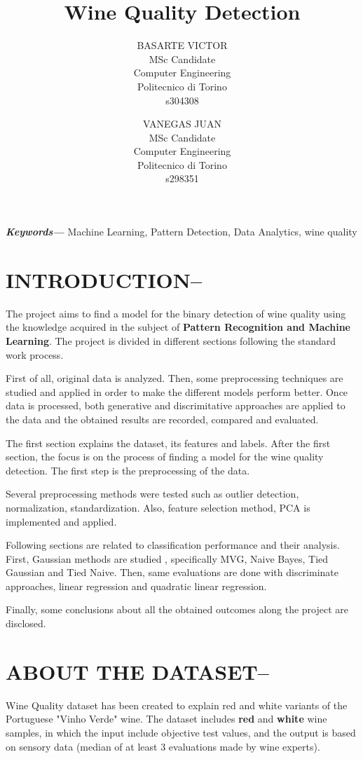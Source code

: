 \documentclass[12pt, twocolumn]{article}
\title{Wine Quality Detection}
\author{
  BASARTE VICTOR\\
  MSc Candidate\\
  Computer Engineering\\
  Politecnico di Torino\\
  s304308
  \\
  \and
  VANEGAS JUAN\\
  MSc Candidate\\
  Computer Engineering\\
  Politecnico di Torino\\
  s298351\\
}
\providecommand{\keywords}[1]{\textbf{\textit{Keywords---}} #1}
\begin{document}
  \maketitle

  \begin{abstract}
  \end{abstract}

  \keywords{ Machine Learning, Pattern Detection, Data Analytics, wine quality}


  \section{INTRODUCTION--}
  The project aims to find a model for the binary detection of wine quality
  using the knowledge acquired in the subject of \textbf{Pattern Recognition
  and
  Machine Learning}. The project is divided in different sections following the standard work process.

  First of all, original data is analyzed. Then, some preprocessing techniques are studied and applied in order to make the different models perform better. Once data is processed, both generative and discrimitative approaches are applied to the data and the obtained results are recorded, compared and evaluated.

  The first section explains the dataset, its features and labels.
  After the first section, the focus is on the process of finding a model for
  the wine quality detection. The first step is the preprocessing of
  the data.

  Several preprocessing methods were tested such as outlier detection, normalization, standardization. Also, feature selection method, PCA is implemented and applied.

Following sections are related to classification performance and their analysis. First, Gaussian methods are studied , specifically MVG, Naive Bayes, Tied Gaussian and Tied Naive.
Then, same evaluations are done with discriminate approaches, linear regression and 
quadratic linear regression.

Finally, some conclusions about all the obtained outcomes along the project are disclosed.







  \section{ABOUT THE DATASET--}
  Wine Quality dataset \cite{CORTEZ2009547} has been created to explain red
  and white variants of the Portuguese "Vinho Verde" \cite{VinhoVerde} wine.
  The dataset includes \textbf{red} and \textbf{white} wine samples, in which
  the input include objective test values, and the output is based on
  sensory data (median of at least 3 evaluations made by wine experts).
\end{document}
